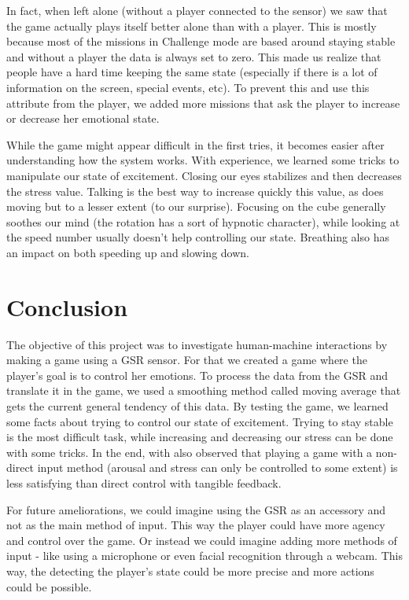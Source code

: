 \documentclass[12pt,a4paper]{article}
\begin{document}
In fact, when left alone (without a player connected to the sensor) we saw that the game actually plays itself better alone than with a player. This is mostly because most of the missions in Challenge mode are based around staying stable and without a player the data is always set to zero. This made us realize that people have a hard time keeping the same state (especially if there is a lot of information on the screen, special events, etc). To prevent this and use this attribute from the player, we added more missions that ask the player to increase or decrease her emotional state.

While the game might appear difficult in the first tries, it becomes easier after understanding how the system works. With experience, we learned some tricks to manipulate our state of excitement. Closing our eyes stabilizes and then decreases the stress value. Talking is the best way to increase quickly this value, as does moving but to a lesser extent (to our surprise). Focusing on the cube generally soothes our mind (the rotation has a sort of hypnotic character), while looking at the speed number usually doesn't help controlling our state. Breathing also has an impact on both speeding up and slowing down. 

\section{Conclusion}

The objective of this project was to investigate human-machine interactions by making a game using a GSR sensor. For that we created a game where the player's goal is to control her emotions. To process the data from the GSR and translate it in the game, we used a smoothing method called moving average that gets the current general tendency of this data. By testing the game, we learned some facts about trying to control our state of excitement. Trying to stay stable is the most difficult task, while increasing and decreasing our stress can be done with some tricks. In the end, with also observed that playing a game with a non-direct input method (arousal and stress can only be controlled to some extent) is less satisfying than direct control with tangible feedback.

For future ameliorations, we could imagine using the GSR as an accessory and not as the main method of input. This way the player could have more agency and control over the game. Or instead we could imagine adding more methods of input - like using a microphone or even facial recognition through a webcam. This way, the detecting the player's state could be more precise and more actions could be possible.
\end{document}
